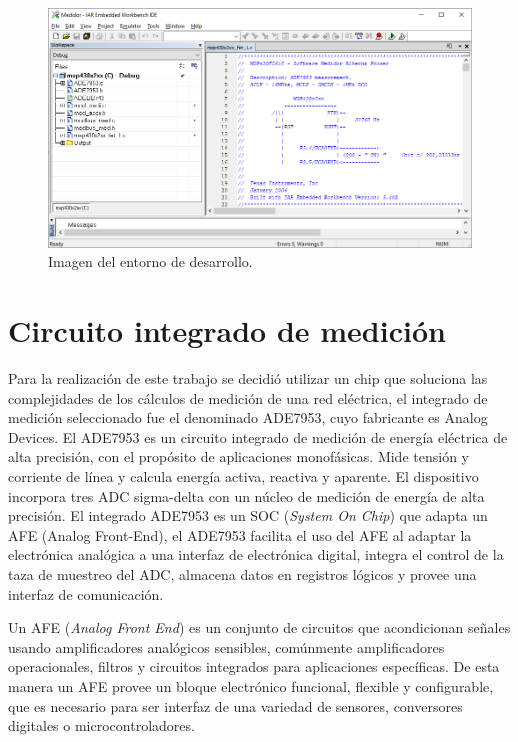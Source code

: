 \begin{figure}[h]
	\centering
	\includegraphics[width=\textwidth,keepaspectratio]{Figures/Embeddedworkbench.png}
	\caption{Imagen del entorno de desarrollo.}
	\label{fig:IARwindow}
\end{figure}



\section{Circuito integrado de medición}
\label{sec:cap2parte3}

Para la realización de este trabajo se decidió utilizar un chip que soluciona las complejidades de los cálculos de medición de una red eléctrica, el integrado de medición seleccionado fue el denominado ADE7953, cuyo fabricante es Analog Devices. El ADE7953 es un circuito integrado de medición de energía eléctrica de alta precisión, con el propósito de aplicaciones monofásicas. Mide tensión y corriente de línea y calcula energía activa, reactiva y aparente. El dispositivo incorpora tres ADC sigma-delta con un núcleo de medición de energía de alta precisión. El integrado ADE7953 es un SOC (\textit{System On Chip}) que adapta un AFE (Analog Front-End), el ADE7953 facilita el uso del AFE al adaptar la electrónica analógica a una interfaz de electrónica digital, integra el control de la taza de muestreo del ADC, almacena datos en registros lógicos y provee una interfaz de comunicación.


Un AFE (\textit{Analog Front End}) es un conjunto de circuitos que acondicionan señales usando amplificadores analógicos sensibles, comúnmente amplificadores operacionales, filtros y circuitos integrados para aplicaciones específicas. De esta manera un AFE provee un bloque electrónico funcional, flexible y configurable, que es necesario para ser interfaz de una variedad de sensores, conversores digitales o microcontroladores.


